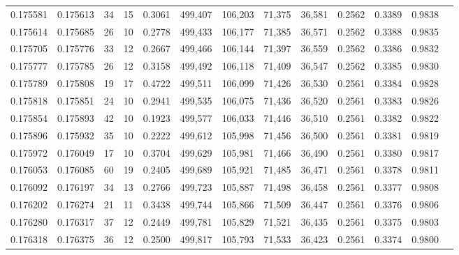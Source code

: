 \begin{tabular}{rrrrrrrrrrrrr}
0.175581 & 0.175613 &    34 &  15 &                                     0.3061 & 499,407 & 106,203 &  71,375 &  36,581 & 0.2562 & 0.3389 & 0.9838 \\
0.175614 & 0.175685 &    26 &  10 &                                     0.2778 & 499,433 & 106,177 &  71,385 &  36,571 & 0.2562 & 0.3388 & 0.9835 \\
0.175705 & 0.175776 &    33 &  12 &                                     0.2667 & 499,466 & 106,144 &  71,397 &  36,559 & 0.2562 & 0.3386 & 0.9832 \\
0.175777 & 0.175785 &    26 &  12 &                                     0.3158 & 499,492 & 106,118 &  71,409 &  36,547 & 0.2562 & 0.3385 & 0.9830 \\
0.175789 & 0.175808 &    19 &  17 &                                     0.4722 & 499,511 & 106,099 &  71,426 &  36,530 & 0.2561 & 0.3384 & 0.9828 \\
0.175818 & 0.175851 &    24 &  10 &                                     0.2941 & 499,535 & 106,075 &  71,436 &  36,520 & 0.2561 & 0.3383 & 0.9826 \\
0.175854 & 0.175893 &    42 &  10 &                                     0.1923 & 499,577 & 106,033 &  71,446 &  36,510 & 0.2561 & 0.3382 & 0.9822 \\
0.175896 & 0.175932 &    35 &  10 &                                     0.2222 & 499,612 & 105,998 &  71,456 &  36,500 & 0.2561 & 0.3381 & 0.9819 \\
0.175972 & 0.176049 &    17 &  10 &                                     0.3704 & 499,629 & 105,981 &  71,466 &  36,490 & 0.2561 & 0.3380 & 0.9817 \\
0.176053 & 0.176085 &    60 &  19 &                                     0.2405 & 499,689 & 105,921 &  71,485 &  36,471 & 0.2561 & 0.3378 & 0.9811 \\
0.176092 & 0.176197 &    34 &  13 &                                     0.2766 & 499,723 & 105,887 &  71,498 &  36,458 & 0.2561 & 0.3377 & 0.9808 \\
0.176202 & 0.176274 &    21 &  11 &                                     0.3438 & 499,744 & 105,866 &  71,509 &  36,447 & 0.2561 & 0.3376 & 0.9806 \\
0.176280 & 0.176317 &    37 &  12 &                                     0.2449 & 499,781 & 105,829 &  71,521 &  36,435 & 0.2561 & 0.3375 & 0.9803 \\
0.176318 & 0.176375 &    36 &  12 &                                     0.2500 & 499,817 & 105,793 &  71,533 &  36,423 & 0.2561 & 0.3374 & 0.9800 \\

\end{tabular}
